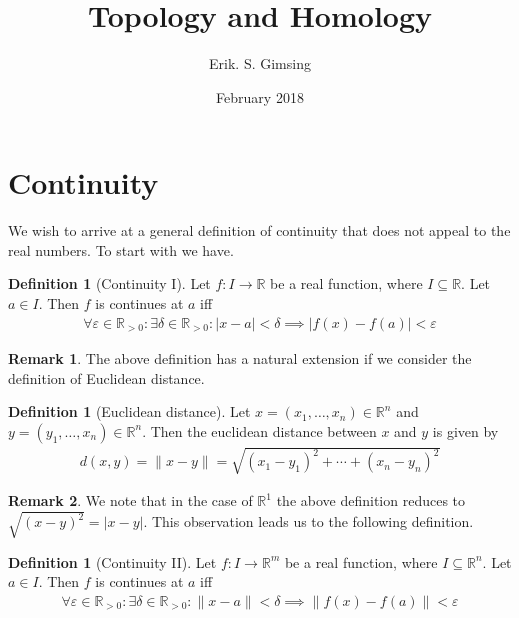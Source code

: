 \documentclass{article}
\title{Topology and Homology}
\author{Erik. S. Gimsing}
\date{February 2018}
\theoremstyle{plain}
\theoremstyle{definition}
\newtheorem*{remark}{Remark}
\newtheorem{definition}[theorem]{Definition}
\newcommand{\R}{\mathbb{R}}
\begin{document}
\maketitle
\section{Continuity}
We wish to arrive at a general definition of continuity that does not appeal to
the real numbers. To start with we have.
\begin{definition}[Continuity I]
	Let $f:I\rightarrow\R$ be a real function, where $I\subseteq\R$. Let
	$a\in I$. Then $f$ is continues at $a$ iff
	\begin{equation}
	\begin{aligned}
		\forall\varepsilon\in\R_{>0}:\exists\delta\in\R_{>0}:|x-a|<\delta
		\implies|f(x)-f(a)|<\varepsilon
	\end{aligned}
	\end{equation}
\end{definition}
\begin{remark}
The above definition has a natural extension if we consider the definition of
Euclidean distance.
\end{remark}
\begin{definition}[Euclidean distance]
	Let $x=(x_1,\dots,x_n)\in\R^n$ and $y=(y_1,\dots,x_n)\in\R^n$. Then the
	euclidean distance between $x$ and $y$ is given by
	\begin{equation}
	\begin{aligned}
		d(x,y)=\|x-y\|=\sqrt{{(x_1-y_1)}^2+\cdots+{(x_n-y_n)}^2}
	\end{aligned}
	\end{equation}
\end{definition}
\begin{remark}
	We note that in the case of $\R^1$ the above definition reduces to
	$\sqrt{{(x-y)}^2}=|x-y|$. This observation leads us to the following
	definition.
\end{remark}
\begin{definition}[Continuity II]
	Let $f:I\rightarrow\R^m$ be a real function, where $I\subseteq\R^n$. Let
	$a\in I$. Then $f$ is continues at $a$ iff
	\begin{equation}
	\begin{aligned}
		\forall\varepsilon\in\R_{>0}:\exists\delta\in\R_{>0}:\|x-a\|<\delta
		\implies\|f(x)-f(a)\|<\varepsilon
	\end{aligned}
	\end{equation}
\end{definition}
\end{document}
